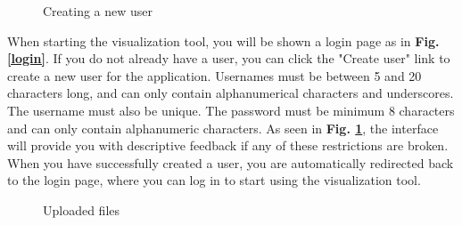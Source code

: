 \begin{figure}[h!]
    \centering
        \caption{Creating a new user}
        \label{create-user}
\end{figure}

\noindent When starting the visualization tool, you will be shown a login page as in \textbf{Fig. \ref{login}}. If you do not already have a user, you can click the "Create user" link to create a new user for the application. Usernames must be between 5 and 20 characters long, and can only contain alphanumerical characters and underscores. The username must also be unique. The password must be minimum 8 characters and can only contain alphanumeric characters. As seen in \textbf{Fig. \ref{create-user}}, the interface will provide you with descriptive feedback if any of these restrictions are broken. When you have successfully created a user, you are automatically redirected back to the login page, where you can log in to start using the visualization tool. \\


\begin{figure}[h!]
    \centering
        \caption{Uploaded files}
        \label{all-files}
\end{figure}

